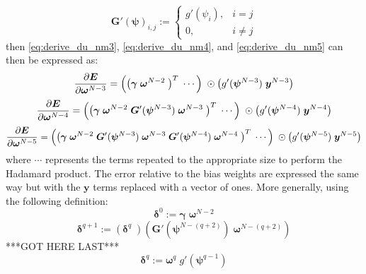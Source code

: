 \documentclass{article}
\begin{document}
%
\begin{equation} \label{eq:Gp}
\bm{G}' (\bm{\psi})_{i,j} :=
\begin{cases}
g' (\psi_i), & i = j \\
0, & i \neq j
\end{cases}
\end{equation}
%
then \eqref{eq:derive_du_nm3}, \eqref{eq:derive_du_nm4}, and \eqref{eq:derive_du_nm5} can then be expressed as:
%
\begin{equation} \label{eq:derive_du_nm3_matrix}
\frac{\partial \bm{E}}{\partial \bm{\omega}^{N-3}} =
\left(
\left(
\bm{\gamma} \;
\bm{\omega}^{N-2} \;
\right)^T \;
\cdots
\right) \;
\odot
\left(
g' (\bm{\psi}^{N-3}) \;
\bm{y}^{N-3} \\
\right)
\end{equation}
%
\begin{equation} \label{eq:derive_du_nm4_matrix}
\frac{\partial \bm{E}}{\partial \bm{\omega}^{N-4}} =
\left(
\left(
\bm{\gamma} \;
\bm{\omega}^{N-2} \;
\bm{G}' (\bm{\psi}^{N-3}) \;
\bm{\omega}^{N-3} \;
\right)^T \;
\cdots
\right) \;
\odot
\left(
g' (\bm{\psi}^{N-4}) \;
\bm{y}^{N-4} \\
\right)
\end{equation}
%
\begin{equation} \label{eq:derive_du_nm5_matrix}
\frac{\partial \bm{E}}{\partial \bm{\omega}^{N-5}} =
\left(
\left(
\bm{\gamma} \;
\bm{\omega}^{N-2} \;
\bm{G}' (\bm{\psi}^{N-3}) \;
\bm{\omega}^{N-3} \;
\bm{G}' (\bm{\psi}^{N-4}) \;
\bm{\omega}^{N-4} \;
\right)^T \;
\cdots
\right) \;
\odot
\left(
g' (\bm{\psi}^{N-5}) \;
\bm{y}^{N-5} \\
\right)
\end{equation}
%
where $\cdots$ represents the terms repeated to the appropriate size to perform the Hadamard product.
The error relative to the bias weights are expressed the same way but with the $\bm{y}$ terms replaced with a vector of ones.
More generally, using the following definition:
%
\begin{equation} \label{eq:delta0}
\bm{\delta}^0 := \bm{\gamma} \; \bm{\omega}^{N-2}
\end{equation}
%
\begin{equation} \label{eq:deltaq}
\bm{\delta}^{q+1} :=
\left(
\bm{\delta}^q \;
\right)
\left(
\bm{G}' (\bm{\psi}^{N-(q+2)}) \;
\bm{\omega}^{N-(q+2)}
\right)
\end{equation}
***GOT HERE LAST***
%
\begin{equation} \label{eq:delta}
\bm{\delta}^q := \bm{\omega}^q \; g' \left( \bm{\psi}^{q-1} \right)
\end{equation}
\end{document}
